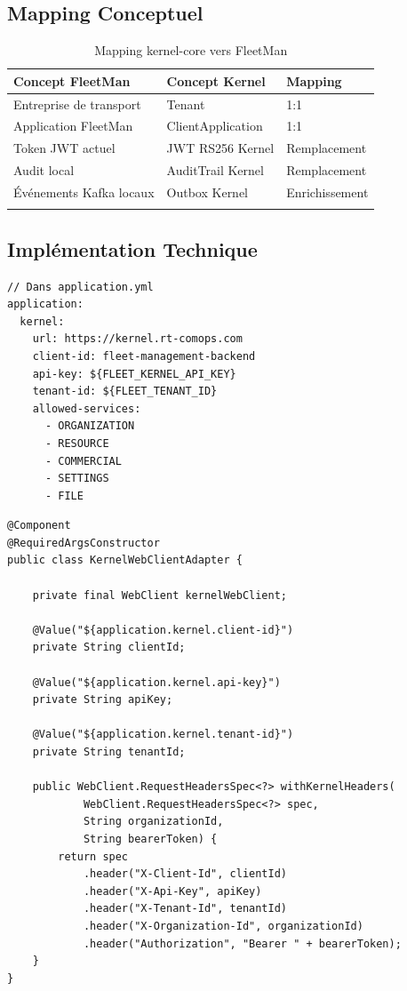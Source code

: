 \documentclass[12pt,a4paper]{report}
\begin{document}
\subsection{Mapping Conceptuel}

\begin{longtable}{p{5cm}p{5cm}p{3cm}}
\toprule
\textbf{Concept FleetMan} & \textbf{Concept Kernel} & \textbf{Mapping} \\
\midrule
\endhead
Entreprise de transport & Tenant & 1:1 \\
Application FleetMan & ClientApplication & 1:1 \\
Token JWT actuel & JWT RS256 Kernel & Remplacement \\
Audit local & AuditTrail Kernel & Remplacement \\
Événements Kafka locaux & Outbox Kernel & Enrichissement \\
\bottomrule
\caption{Mapping kernel-core vers FleetMan}
\end{longtable}

\subsection{Implémentation Technique}

\begin{lstlisting}[style=javaStyle, caption={Configuration de la ClientApplication FleetMan}]
// Dans application.yml
application:
  kernel:
    url: https://kernel.rt-comops.com
    client-id: fleet-management-backend
    api-key: ${FLEET_KERNEL_API_KEY}
    tenant-id: ${FLEET_TENANT_ID}
    allowed-services:
      - ORGANIZATION
      - RESOURCE
      - COMMERCIAL
      - SETTINGS
      - FILE
\end{lstlisting}

\begin{lstlisting}[style=javaStyle, caption={Adapter WebClient vers le Kernel}]
@Component
@RequiredArgsConstructor
public class KernelWebClientAdapter {

    private final WebClient kernelWebClient;

    @Value("${application.kernel.client-id}")
    private String clientId;

    @Value("${application.kernel.api-key}")
    private String apiKey;

    @Value("${application.kernel.tenant-id}")
    private String tenantId;

    public WebClient.RequestHeadersSpec<?> withKernelHeaders(
            WebClient.RequestHeadersSpec<?> spec,
            String organizationId,
            String bearerToken) {
        return spec
            .header("X-Client-Id", clientId)
            .header("X-Api-Key", apiKey)
            .header("X-Tenant-Id", tenantId)
            .header("X-Organization-Id", organizationId)
            .header("Authorization", "Bearer " + bearerToken);
    }
}
\end{lstlisting}
\end{document}
